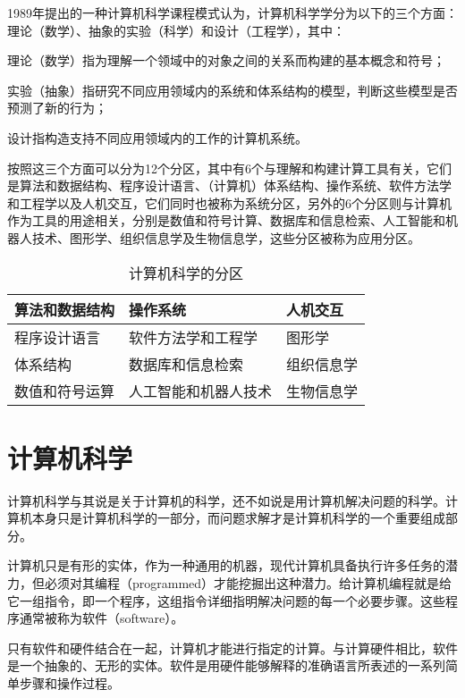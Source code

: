 1989年提出的一种计算机科学课程模式认为，计算机科学学分为以下的三个方面：理论（数学）、抽象的实验（科学）和设计（工程学），其中：

\begin{compactitem}
\item 理论（数学）指为理解一个领域中的对象之间的关系而构建的基本概念和符号；
\item 实验（抽象）指研究不同应用领域内的系统和体系结构的模型，判断这些模型是否预测了新的行为；
\item 设计指构造支持不同应用领域内的工作的计算机系统。
\end{compactitem}

按照这三个方面可以分为12个分区，其中有6个与理解和构建计算工具有关，它们是算法和数据结构、程序设计语言、（计算机）体系结构、操作系统、软件方法学和工程学以及人机交互，它们同时也被称为系统分区，另外的6个分区则与计算机作为工具的用途相关，分别是数值和符号计算、数据库和信息检索、人工智能和机器人技术、图形学、组织信息学及生物信息学，这些分区被称为应用分区。

\begin{table}[htbp]
\centering
\caption{计算机科学的分区}
\label{计算机科学的分区}
\begin{tabular}{|p{110pt}|p{110pt}|p{110pt}|}
\hline
算法和数据结构 & 操作系统 & 人机交互	\\
\hline
程序设计语言 & 软件方法学和工程学 & 图形学	\\
\hline
体系结构 & 数据库和信息检索 & 组织信息学	\\
\hline
数值和符号运算 & 人工智能和机器人技术 & 生物信息学 \\
\hline
\end{tabular}
\end{table}

\section{计算机科学}

计算机科学与其说是关于计算机的科学，还不如说是用计算机解决问题的科学。计算机本身只是计算机科学的一部分，而问题求解才是计算机科学的一个重要组成部分。

计算机只是有形的实体，作为一种通用的机器，现代计算机具备执行许多任务的潜力，但必须对其编程（programmed）才能挖掘出这种潜力。给计算机编程就是给它一组指令，即一个程序，这组指令详细指明解决问题的每一个必要步骤。这些程序通常被称为软件（software）。

只有软件和硬件结合在一起，计算机才能进行指定的计算。与计算硬件相比，软件是一个抽象的、无形的实体。软件是用硬件能够解释的准确语言所表述的一系列简单步骤和操作过程。


